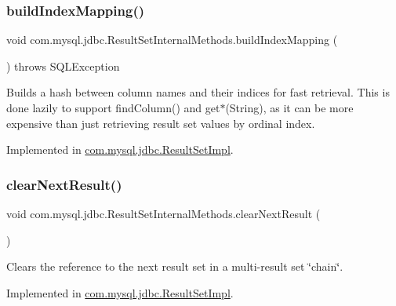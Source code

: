 \subsubsection{\texorpdfstring{build\+Index\+Mapping()}{buildIndexMapping()}}
{\footnotesize\ttfamily void com.\+mysql.\+jdbc.\+Result\+Set\+Internal\+Methods.\+build\+Index\+Mapping (\begin{DoxyParamCaption}{ }\end{DoxyParamCaption}) throws S\+Q\+L\+Exception}

Builds a hash between column names and their indices for fast retrieval. This is done lazily to support find\+Column() and get$\ast$(String), as it can be more expensive than just retrieving result set values by ordinal index. 

Implemented in \mbox{\hyperlink{classcom_1_1mysql_1_1jdbc_1_1_result_set_impl_a452c11779f86bee1e87c0b8231a23dd1}{com.\+mysql.\+jdbc.\+Result\+Set\+Impl}}.

\mbox{\label{interfacecom_1_1mysql_1_1jdbc_1_1_result_set_internal_methods_abda1557c737e5ac6762d58e43fae2195}} 
\subsubsection{\texorpdfstring{clear\+Next\+Result()}{clearNextResult()}}
{\footnotesize\ttfamily void com.\+mysql.\+jdbc.\+Result\+Set\+Internal\+Methods.\+clear\+Next\+Result (\begin{DoxyParamCaption}{ }\end{DoxyParamCaption})}

Clears the reference to the next result set in a multi-\/result set \char`\"{}chain\char`\"{}. 

Implemented in \mbox{\hyperlink{classcom_1_1mysql_1_1jdbc_1_1_result_set_impl_a1e36a4b0bf39b90b06dea75eb4d8c66e}{com.\+mysql.\+jdbc.\+Result\+Set\+Impl}}.

